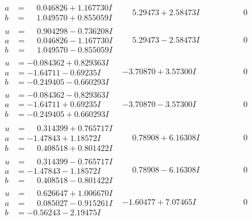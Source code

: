 \documentclass[1p]{elsarticle_modified}
\theoremstyle{definition}
\begin{document}
$$\begin{array}{c|c|c}
\begin{aligned}
a &= \phantom{-}0.046826 + 1.167730 I \\
b &= \phantom{-}1.049570 + 0.855059 I\end{aligned}
 & \phantom{-}5.29473 + 2.58473 I & \phantom{-0.000000 } 0 \\ \hline\begin{aligned}
u &= \phantom{-}0.904298 - 0.736208 I \\
a &= \phantom{-}0.046826 - 1.167730 I \\
b &= \phantom{-}1.049570 - 0.855059 I\end{aligned}
 & \phantom{-}5.29473 - 2.58473 I & \phantom{-0.000000 } 0 \\ \hline\begin{aligned}
u &= -0.084362 + 0.829363 I \\
a &= -1.64711 - 0.69235 I \\
b &= -0.249405 - 0.660293 I\end{aligned}
 & -3.70870 + 3.57300 I & \phantom{-0.000000 } 0 \\ \hline\begin{aligned}
u &= -0.084362 - 0.829363 I \\
a &= -1.64711 + 0.69235 I \\
b &= -0.249405 + 0.660293 I\end{aligned}
 & -3.70870 - 3.57300 I & \phantom{-0.000000 } 0 \\ \hline\begin{aligned}
u &= \phantom{-}0.314399 + 0.765717 I \\
a &= -1.47843 + 1.18572 I \\
b &= \phantom{-}0.408518 + 0.801422 I\end{aligned}
 & \phantom{-}0.78908 + 6.16308 I & \phantom{-0.000000 } 0 \\ \hline\begin{aligned}
u &= \phantom{-}0.314399 - 0.765717 I \\
a &= -1.47843 - 1.18572 I \\
b &= \phantom{-}0.408518 - 0.801422 I\end{aligned}
 & \phantom{-}0.78908 - 6.16308 I & \phantom{-0.000000 } 0 \\ \hline\begin{aligned}
u &= \phantom{-}0.626647 + 1.006670 I \\
a &= \phantom{-}0.085027 - 0.915261 I \\
b &= -0.56243 - 2.19475 I\end{aligned}
 & -1.60477 + 7.07465 I & \phantom{-0.000000 } 0 \\ \hline\begin{aligned}

\end{aligned}
\end{array}$$
\end{document}
